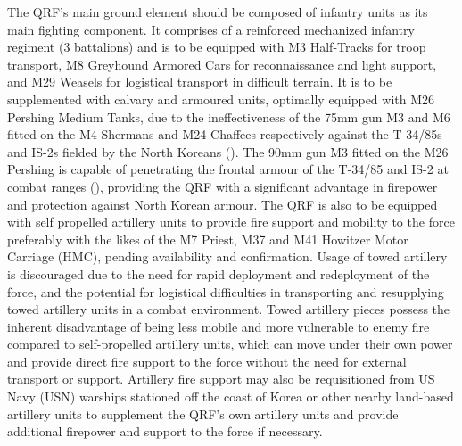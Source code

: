 \documentclass[a4paper,12pt]{article}
\begin{document}
{	The QRF's main ground element should be composed of infantry units as its main fighting component. It comprises of a reinforced mechanized infantry regiment (3 battalions) and is to be equipped with M3 Half-Tracks for troop transport, M8 Greyhound Armored Cars for reconnaissance and light support, and M29 Weasels for logistical transport in difficult terrain. It is to be supplemented with calvary and armoured units, optimally equipped with M26 Pershing Medium Tanks, due to the ineffectiveness of the 75mm gun M3 and M6 fitted on the M4 Shermans and M24 Chaffees respectively against the T-34/85s and IS-2s fielded by the North Koreans (\cite{bird2001world}). The 90mm gun M3 fitted on the M26 Pershing is capable of penetrating the frontal armour of the T-34/85 and IS-2 at combat ranges (\cite{bird2001world}), providing the QRF with a significant advantage in firepower and protection against North Korean armour. The QRF is also to be equipped with self propelled artillery units to provide fire support and mobility to the force preferably with the likes of the M7 Priest, M37 and M41 Howitzer Motor Carriage (HMC), pending availability and confirmation. Usage of towed artillery is discouraged due to the need for rapid deployment and redeployment of the force, and the potential for logistical difficulties in transporting and resupplying towed artillery units in a combat environment. Towed artillery pieces possess the inherent disadvantage of being less mobile and more vulnerable to enemy fire compared to self-propelled artillery units, which can move under their own power and provide direct fire support to the force without the need for external transport or support. Artillery fire support may also be requisitioned from US Navy (USN) warships stationed off the coast of Korea or other nearby land-based artillery units to supplement the QRF's own artillery units and provide additional firepower and support to the force if necessary.
	\\
}
\end{document}
